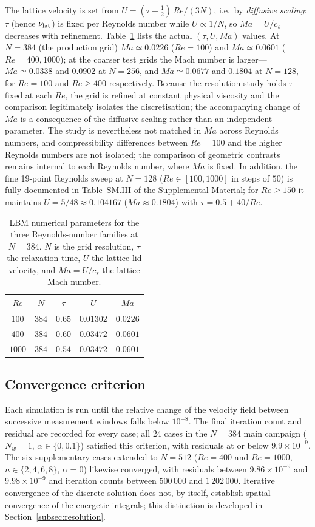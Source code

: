 The lattice velocity is set from $U=(\tau-\tfrac12)\,Re/(3N)$, i.e.\ by \emph{diffusive scaling}: $\tau$ (hence $\nu_{\rm lat}$) is fixed per Reynolds number while $U\propto1/N$, so $Ma=U/c_s$ decreases with refinement. Table~\ref{tab:params} lists the actual $(\tau,U,Ma)$ values. At $N=384$ (the production grid) $Ma\simeq0.0226$ ($Re=100$) and $Ma\simeq0.0601$ ($Re=400,1000$); at the coarser test grids the Mach number is larger---$Ma\simeq0.0338$ and $0.0902$ at $N=256$, and $Ma\simeq0.0677$ and $0.1804$ at $N=128$, for $Re=100$ and $Re\ge400$ respectively. Because the resolution study holds $\tau$ fixed at each $Re$, the grid is refined at constant physical viscosity and the comparison legitimately isolates the discretisation; the accompanying change of $Ma$ is a consequence of the diffusive scaling rather than an independent parameter. The study is nevertheless not matched in $Ma$ across Reynolds numbers, and compressibility differences between $Re=100$ and the higher Reynolds numbers are not isolated; the comparison of geometric contrasts remains internal to each Reynolds number, where $Ma$ is fixed. In addition, the fine 19-point Reynolds sweep at $N=128$ ($Re\in[100,1000]$ in steps of $50$) is fully documented in Table~SM.III of the Supplemental Material; for $Re\ge 150$ it maintains $U=5/48\approx0.104167$ ($Ma\approx0.1804$) with $\tau=0.5+40/Re$.

\begin{table}[t]
\centering
\caption{LBM numerical parameters for the three Reynolds-number families at $N=384$. $N$ is the grid resolution, $\tau$ the relaxation time, $U$ the lattice lid velocity, and $Ma=U/c_s$ the lattice Mach number.}
\label{tab:params}
\begin{tabular}{@{}ccccc@{}}
\hline
$Re$ & $N$ & $\tau$ & $U$ & $Ma$ \\
\hline
$100$  & $384$ & $0.65$ & $0.01302$ & $0.0226$ \\
$400$  & $384$ & $0.60$ & $0.03472$ & $0.0601$ \\
$1000$ & $384$ & $0.54$ & $0.03472$ & $0.0601$ \\
\hline
\end{tabular}
\end{table}
\subsection{Convergence criterion}
\label{subsec:convergence}

Each simulation is run until the relative change of the velocity field between successive measurement windows falls below $10^{-8}$. The final iteration count and residual are recorded for every case; all $24$ cases in the $N=384$ main campaign ($N_w=1$, $\alpha\in\{0,0.1\}$) satisfied this criterion, with residuals at or below $9.9\times10^{-9}$. The six supplementary cases extended to $N=512$ ($Re=400$ and $Re=1000$, $n\in\{2,4,6,8\}$, $\alpha=0$) likewise converged, with residuals between $9.86\times10^{-9}$ and $9.98\times10^{-9}$ and iteration counts between $500\,000$ and $1\,202\,000$. Iterative convergence of the discrete solution does not, by itself, establish spatial convergence of the energetic integrals; this distinction is developed in Section~\ref{subsec:resolution}.

